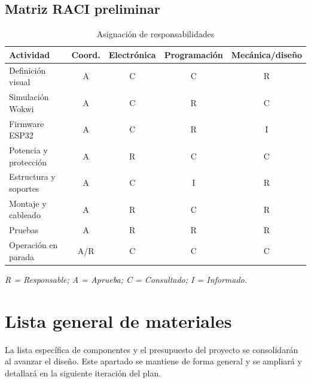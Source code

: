 \documentclass[11pt,a4paper]{article}
\begin{document}
\subsection{Matriz RACI preliminar}
\begin{table}[H]
\centering
\caption{Asignación de responsabilidades}
\begin{tabularx}{\textwidth}{@{}P{4.3cm}C C C C@{}}
\toprule
\textbf{Actividad} & \textbf{Coord.} & \textbf{Electrónica} & \textbf{Programación} & \textbf{Mecánica/diseño}\\
\midrule
Definición visual & A & C & C & R\\
Simulación Wokwi & A & C & R & C\\
Firmware ESP32 & A & C & R & I\\
Potencia y protección & A & R & C & C\\
Estructura y soportes & A & C & I & R\\
Montaje y cableado & A & R & C & R\\
Pruebas & A & R & R & R\\
Operación en parada & A/R & C & C & C\\
\bottomrule
\end{tabularx}
\end{table}
\textit{R = Responsable; A = Aprueba; C = Consultado; I = Informado.}

\section{Lista general de materiales}
La lista específica de componentes y el presupuesto del proyecto se
consolidarán al avanzar el diseño. Este apartado se mantiene de forma general y
se ampliará y detallará en la siguiente iteración del plan.

\end{document}
